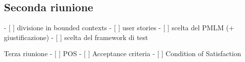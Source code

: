 \subsection{Seconda riunione}
\label{sec:seconda-riunione}

- [ ] divisione in bounded contexts
- [ ] user stories
- [ ] scelta del PMLM (+ giustificazione)
- [ ] scelta del framework di test

Terza riunione
- [ ] POS
  - [ ] Acceptance criteria
  - [ ] Condition of Satisfaction 